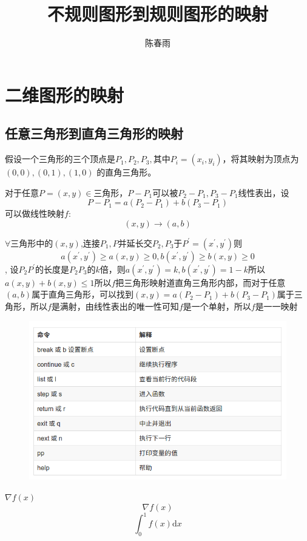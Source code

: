 \documentclass[12pt,a4paper]{article}
\title{不规则图形到规则图形的映射}
\author{陈春雨}
\date{\chntoday}
\begin{document}
\maketitle
\newpage
\section{二维图形的映射}
\subsection{ 任意三角形到直角三角形的映射}
假设一个三角形的三个顶点是$P_1,P_2,P_3,$其中$P_i=(x_i,y_i)$，将其映射为顶点为$(0,0),(0,1),(1,0)$
的直角三角形。

对于任意$P=(x,y)\in $三角形，$P-P_1$可以被$P_2-P_1,P_3-P_1$线性表出，设
$$
P-P_1=a(P_2-P_1)+b(P_3-P_1)
$$
可以做线性映射$f$:
$$
(x,y)\to (a,b)
$$

$\forall$三角形中的$ (x,y)$,连接$P_1,P$并延长交$P_2,P_3$于$P^{'}=(x^{'},y^{'})$则
$$
a(x^{'},y^{'})\ge a(x,y) \ge 0,b(x^{'},y^{'})\ge b(x,y) \ge 0
$$,
设$P_2P^{'}$的长度是$P_2P_3$的$k$倍，则$a(x^{'},y^{'})=k,b(x^{'},y^{'})=1-k$所以$a(x,y)+b(x,y)\le 1$所以$f$把三角形映射道直角三角形内部，而对于任意$(a,b)$属于直角三角形，可以找到$(x,y)=a(P_2-P_1)+b(P_3-P_1)$属于三角形，所以$f$是满射，由线性表出的唯一性可知$f$是一个单射，所以$f$是一一映射


\begin{figure}[H]
\centering
\includegraphics[scale=0.5]{./figures/Figure_1.png}
\end{figure}
$\nabla f(x)$
$$\nabla f(x)$$
\begin{equation}
    \int_0^1f(x)\mathrm{d}x
\end{equation}
\end{document}
